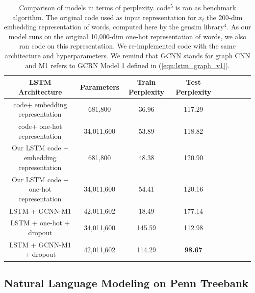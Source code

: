 \documentclass{article} %
\newcommand{\eqnref}[1]{(\ref{eqn:#1})}
\begin{document}
\begin{table}[t]
	\centering
	{\small
		\begin{tabular}{|c|c|c|c|c|c|c|c|c|}
			\hline
			LSTM Architecture & Parameters & Train Perplexity & Test Perplexity  \\
			\hline
			\cite{zaremba2014recurrent} code\footnotemark[5] + embedding representation & 681,800 & 36.96 & 117.29 \\
			\cite{zaremba2014recurrent} code\footnotemark[5] + one-hot representation & 34,011,600 & 53.89 & 118.82 \\
			Our LSTM code + embedding representation & 681,800 & 48.38 & 120.90 \\
			Our LSTM code + one-hot representation & 34,011,600 & 54.41 & 120.16 \\
			LSTM + GCNN-M1 & 42,011,602 & 18.49 & 177.14 \\
			LSTM + one-hot + dropout  & 34,011,600 & 145.59 & 112.98 \\
			LSTM + GCNN-M1 + dropout & 42,011,602 & 114.29 & {\bf 98.67} \\
			\hline
		\end{tabular}
	}
	\caption{Comparison of models in terms of perplexity. \cite{zaremba2014recurrent} code$^5$ is ran as benchmark algorithm. The original \cite{zaremba2014recurrent} code used as input representation for $x_t$ the 200-dim embedding representation of words, computed here by the gensim library$^4$. As our model runs on the original 10,000-dim one-hot representation of words, we also ran \cite{zaremba2014recurrent} code on this representation. We re-implemented \cite{zaremba2014recurrent} code with the same architecture and hyperparameters. We remind that GCNN stands for graph CNN and M1 refers to GCRN Model 1 defined in \eqnref{lstm_graph_v1}.} 
	\label{tab1}
\end{table}
\subsection{Natural Language Modeling on Penn Treebank}
\end{document}
